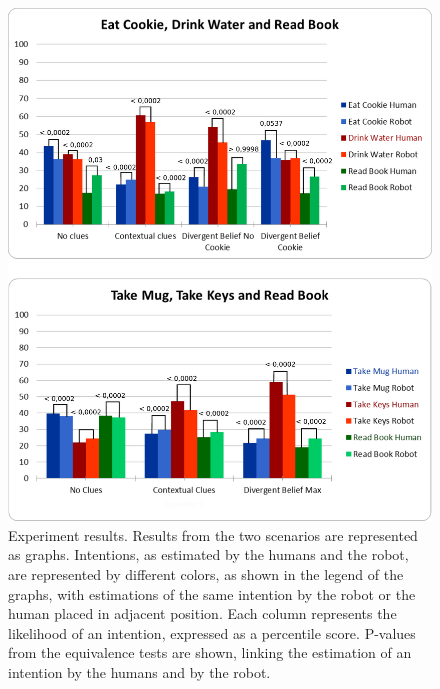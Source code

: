  \begin{figure}[ht!]
	\centering
	\includegraphics[clip,scale=0.5]{img/situation_assessment/pvalues1.pdf}
	\caption[Experiment results]{Experiment results. Results from the two scenarios are represented as graphs. Intentions, as estimated by the humans and the robot, are represented by different colors, as shown in the legend of the graphs, with estimations of the same intention by the robot or the human placed in adjacent position. Each column represents the likelihood of an intention, expressed as a percentile score. P-values from the equivalence tests are shown, linking the estimation of an intention by the humans and by the robot.}
	\label{fig:situation_assessment-user_study_results}
\end{figure}



